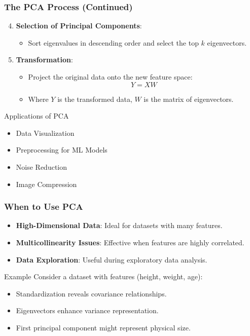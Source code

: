 \documentclass[aspectratio=169]{beamer}
\begin{document}
\begin{frame}[fragile]
    \frametitle{The PCA Process (Continued)}
    \begin{enumerate}
        \setcounter{enumi}{3}
        \item \textbf{Selection of Principal Components}:
            \begin{itemize}
                \item Sort eigenvalues in descending order and select the top \( k \) eigenvectors.
            \end{itemize}

        \item \textbf{Transformation}:
            \begin{itemize}
                \item Project the original data onto the new feature space:
                \begin{equation}
                    Y = XW
                \end{equation}
                \item Where \( Y \) is the transformed data, \( W \) is the matrix of eigenvectors.
            \end{itemize}
    \end{enumerate}

    \begin{block}{Applications of PCA}
        \begin{itemize}
            \item Data Visualization
            \item Preprocessing for ML Models
            \item Noise Reduction
            \item Image Compression
        \end{itemize}
    \end{block}
\end{frame}

\begin{frame}[fragile]
    \frametitle{When to Use PCA}
    \begin{itemize}
        \item \textbf{High-Dimensional Data}: Ideal for datasets with many features.
        \item \textbf{Multicollinearity Issues}: Effective when features are highly correlated.
        \item \textbf{Data Exploration}: Useful during exploratory data analysis.
    \end{itemize}

    \begin{block}{Example}
        Consider a dataset with features (height, weight, age):
        \begin{itemize}
            \item Standardization reveals covariance relationships.
            \item Eigenvectors enhance variance representation.
            \item First principal component might represent physical size.
        \end{itemize}
    \end{block}
\end{frame}
\end{document}
